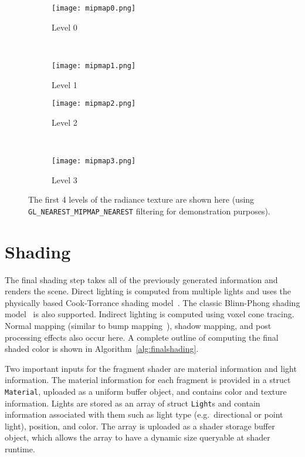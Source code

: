 \begin{figure}[h!]
\centering
    \begin{subfigure}[t]{0.4\textwidth}
        \texttt{[image: mipmap0.png]}
        \caption{Level 0}
    \end{subfigure}
    ~
    \begin{subfigure}[t]{0.4\textwidth}
        \texttt{[image: mipmap1.png]}
        \caption{Level 1}
    \end{subfigure}
    \begin{subfigure}[t]{0.4\textwidth}
        \texttt{[image: mipmap2.png]}
        \caption{Level 2}
    \end{subfigure}
    ~
    \begin{subfigure}[t]{0.4\textwidth}
        \texttt{[image: mipmap3.png]}
        \caption{Level 3}
    \end{subfigure}
    \caption{The first 4 levels of the radiance texture are shown here (using \texttt{GL\_NEAREST\_MIPMAP\_NEAREST} filtering for demonstration purposes).}
    \label{fig:radiancefiltered}
\end{figure}

\section{Shading}
The final shading step takes all of the previously generated information and renders the scene. Direct lighting is computed from multiple lights and uses the physically based Cook-Torrance shading model~\cite{Cook:1982:RMC:357290.357293}. The classic Blinn-Phong shading model~\cite{Phong:1975:ICG:360825.360839} is also supported. Indirect lighting is computed using voxel cone tracing. Normal mapping (similar to bump mapping~\cite{Blinn:1978:SWS:965139.507101}), shadow mapping, and post processing effects also occur here. A complete outline of computing the final shaded color is shown in Algorithm~\ref{alg:finalshading}.


Two important inputs for the fragment shader are material information and light information. The material information for each fragment is provided in a struct \texttt{Material}, uploaded as a uniform buffer object, and contains color and texture information. Lights are stored as an array of struct \texttt{Light}s and contain information associated with them such as light type (e.g.\ directional or point light), position, and color. The array is uploaded as a shader storage buffer object, which allows the array to have a dynamic size queryable at shader runtime.

